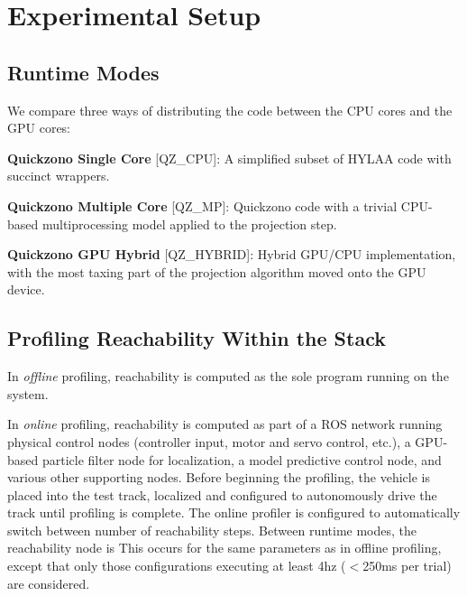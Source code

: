 \documentclass[runningheads]{llncs}
\begin{document}
\section{Experimental Setup}


\subsection{Runtime Modes}
We compare three ways of distributing the code between the CPU cores and the GPU cores:

\textbf{Quickzono Single Core} [QZ\_CPU]: A simplified subset of HYLAA code with succinct wrappers. 

\textbf{Quickzono Multiple Core} [QZ\_MP]: Quickzono code with a trivial CPU-based multiprocessing model \newline applied to the projection step. 

\textbf{Quickzono GPU Hybrid} [QZ\_HYBRID]: Hybrid GPU/CPU implementation, with the most taxing part of the projection algorithm moved onto the GPU device. 


\subsection{Profiling Reachability Within the Stack}

In \textit{offline} profiling, reachability is computed as the sole program running on the system. 

In \textit{online} profiling, reachability is computed as part of a ROS network running physical control nodes (controller input, motor and servo control, etc.), a GPU-based particle filter node for localization, a model predictive control node, and various other supporting nodes. 
Before beginning the profiling, the vehicle is placed into the test track, localized and configured to autonomously drive the track until profiling is complete. 
The online profiler is configured to automatically switch between number of reachability steps. Between runtime modes, the reachability node is  This occurs for the same parameters as in offline profiling, except that only those configurations executing at least 4hz ($\lt$250ms per trial) are considered. %
\end{document}

